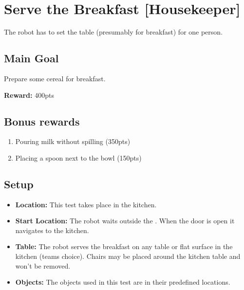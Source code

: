 \section{Serve the Breakfast [Housekeeper]}
\label{test:serve-the-breakfast}
The robot has to set the table (presumably for breakfast) for one person.


\subsection*{Main Goal}
Prepare some cereal for breakfast.

\noindent\textbf{Reward:} 400pts

\subsection*{Bonus rewards}
\begin{enumerate}[nosep]
	\item Pouring milk without spilling (350pts)
	\item Placing a spoon next to the bowl (150pts)
\end{enumerate}

\subsection*{Setup}
\begin{itemize}[nosep]
	\item \textbf{Location:} This test takes place in the kitchen.
	\item \textbf{Start Location:} The robot waits outside the \Arena{}. When the door is open it navigates to the kitchen.
	\item \textbf{Table:} The robot serves the breakfast on any table or flat surface in the kitchen (teams choice). Chairs may be placed around the kitchen table and won't be removed.
	\item \textbf{Objects:} The objects used in this test are in their predefined locations.
\end{itemize}


